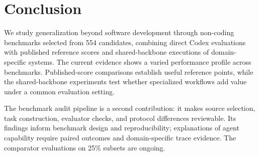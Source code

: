 \section{Conclusion}
\label{sec:conclusion}

We study generalization beyond software development through \StudyBenchmarkCount{} non-coding benchmarks selected
from 554 candidates, combining direct Codex evaluations with published reference scores and
shared-backbone executions of domain-specific systems. The current evidence shows a varied
performance profile across benchmarks. Published-score comparisons establish useful reference
points, while the shared-backbone experiments test whether specialized workflows add value
under a common evaluation setting.

The benchmark audit pipeline is a second contribution: it makes source selection, task
construction, evaluator checks, and protocol differences reviewable. Its findings inform
benchmark design and reproducibility; explanations of agent capability require paired outcomes
and domain-specific trace evidence. The comparator evaluations on 25\% subsets are ongoing.
